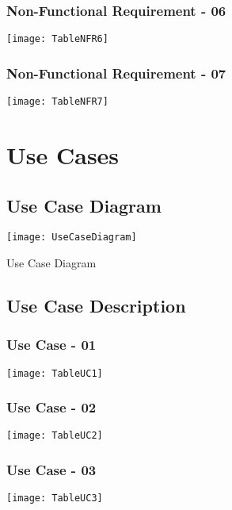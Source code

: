 \begin{figure}[ht]
\subsubsection{Non-Functional Requirement - 06}
\centering
\texttt{[image: TableNFR6]}
\end{figure}

\begin{figure}[ht]
\subsubsection{Non-Functional Requirement - 07}
\centering
\texttt{[image: TableNFR7]}
\end{figure}
\begin{figure}
\section{Use Cases}
\subsection{Use Case Diagram}
\center
\texttt{[image: UseCaseDiagram]}
\caption{Use Case Diagram}
\label{fig:UseCaseDiagram}
\end{figure}

\begin{figure}[ht]
\subsection{Use Case Description}
\subsubsection{Use Case - 01}
\centering
\texttt{[image: TableUC1]}
\end{figure}
\begin{figure}[ht]
\subsubsection{Use Case - 02}
\centering
\texttt{[image: TableUC2]}
\end{figure}

\begin{figure}[ht]
\subsubsection{Use Case - 03}
\centering
\texttt{[image: TableUC3]}
\end{figure}

